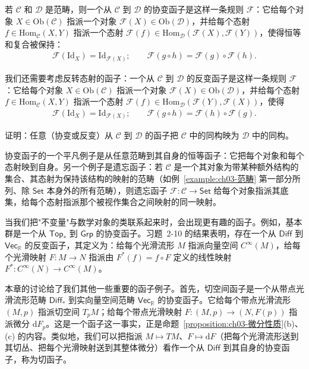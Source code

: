 \documentclass[../../main.tex]{subfiles}
\begin{document}
若 $\mathcal{C}$ 和 $\mathcal{D}$ 是范畴，则一个从 $\mathcal{C}$ 到 $\mathcal{D}$ 的协变函子是这样一条规则 $\mathcal{F}$：它给每个对象 $X\in\mathrm{Ob}(\mathcal{C})$ 指派一个对象 $\mathcal{F}(X)\in\mathrm{Ob}(\mathcal{D})$，并给每个态射 $f\in\mathrm{Hom}_{\mathcal{C}}(X,Y)$ 指派一个态射 $\mathcal{F}(f)\in\mathrm{Hom}_{\mathcal{D}}(\mathcal{F}(X),\mathcal{F}(Y))$，使得恒等和复合被保持：
\begin{align*}
\mathcal{F}(\mathrm{Id}_{X})=\mathrm{Id}_{\mathcal{F}(X)};\qquad \mathcal{F}(g\circ h)=\mathcal{F}(g)\circ\mathcal{F}(h).
\end{align*}

我们还需要考虑反转态射的函子：一个从 $\mathcal{C}$ 到 $\mathcal{D}$ 的反变函子是这样一条规则 $\mathcal{F}$：它给每个对象 $X\in\mathrm{Ob}(\mathcal{C})$ 指派一个对象 $\mathcal{F}(X)\in\mathrm{Ob}(\mathcal{D})$，并给每个态射 $f\in\mathrm{Hom}_{\mathcal{C}}(X,Y)$ 指派一个态射 $\mathcal{F}(f)\in\mathrm{Hom}_{\mathcal{D}}(\mathcal{F}(Y),\mathcal{F}(X))$，使得
\begin{align*}
\mathcal{F}(\mathrm{Id}_{X})=\mathrm{Id}_{\mathcal{F}(X)};\qquad \mathcal{F}(g\circ h)=\mathcal{F}(h)\circ\mathcal{F}(g).
\end{align*}

\begin{exercise}\label{exercise:ch03-3.27}
证明：任意（协变或反变）从 $\mathcal{C}$ 到 $\mathcal{D}$ 的函子把 $\mathcal{C}$ 中的同构映为 $\mathcal{D}$ 中的同构。
\end{exercise}

协变函子的一个平凡例子是从任意范畴到其自身的恒等函子：它把每个对象和每个态射映到自身。另一个例子是遗忘函子：若 $\mathcal{C}$ 是一个其对象为带某种额外结构的集合、其态射为保持该结构的映射的范畴（如例~\cref{example:ch03-范畴} 第一部分所列、除 $\mathsf{Set}$ 本身外的所有范畴），则遗忘函子 $\mathcal{F}:\mathcal{C}\to\mathsf{Set}$ 给每个对象指派其底集，给每个态射指派那个被视作集合之间映射的同一映射。

当我们把"不变量"与数学对象的类联系起来时，会出现更有趣的函子。例如，基本群是一个从 $\mathsf{Top}_{*}$ 到 $\mathsf{Grp}$ 的协变函子。习题~2-10 的结果表明，存在一个从 $\mathsf{Diff}$ 到 $\mathsf{Vec}_{\mathbb{R}}$ 的反变函子，其定义为：给每个光滑流形 $M$ 指派向量空间 $C^{\infty}(M)$，给每个光滑映射 $F:M\to N$ 指派由 $F^{*}(f)=f\circ F$ 定义的线性映射 $F^{*}:C^{\infty}(N)\to C^{\infty}(M)$。

本章的讨论给了我们其他一些重要的函子例子。首先，切空间函子是一个从带点光滑流形范畴 $\mathsf{Diff}_{*}$ 到实向量空间范畴 $\mathsf{Vec}_{\mathbb{R}}$ 的协变函子。它给每个带点光滑流形 $(M,p)$ 指派切空间 $T_{p}M$；给每个带点光滑映射 $F:(M,p)\to(N,F(p))$ 指派微分 $\mathrm{d}F_{p}$。这是一个函子这一事实，正是命题~\cref{proposition:ch03-微分性质}(b)、(c) 的内容。类似地，我们可以把指派 $M\mapsto TM$、$F\mapsto\mathrm{d}F$（把每个光滑流形送到其切丛、把每个光滑映射送到其整体微分）看作一个从 $\mathsf{Diff}$ 到其自身的协变函子，称为切函子。
\end{document}
